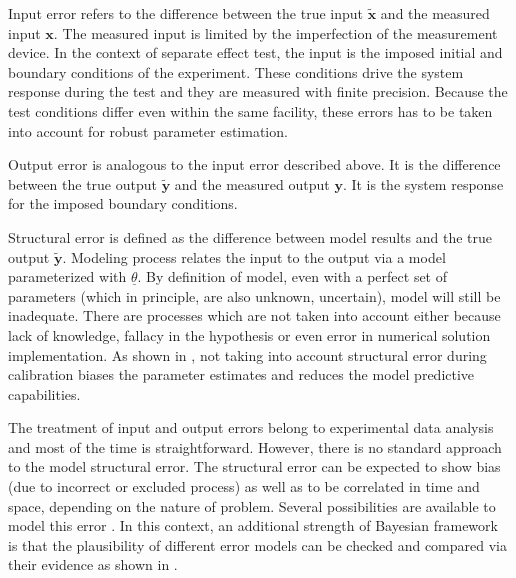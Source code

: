 \documentclass[11pt,titlepage]{article}
\begin{document}
Input error refers to the difference between the true input $\mathbf{\tilde{x}}$ and the measured input $\mathbf{x}$. The measured input is limited by the imperfection of the measurement device. In the context of separate effect test, the input is the imposed initial and boundary conditions of the experiment. These conditions drive the system response during the test and they are measured with finite precision. Because the test conditions differ even within the same facility, these errors has to be taken into account for robust parameter estimation.

Output error is analogous to the input error described above. It is the difference between the true output $\mathbf{\tilde{y}}$ and the measured output $\mathbf{y}$. It is the system response for the imposed boundary conditions. 

Structural error is defined as the difference between model results and the true output $\mathbf{\tilde{y}}$. Modeling process relates the input to the output via a model parameterized with $\underline{\theta}$. By definition of model, even with a perfect set of parameters (which in principle, are also unknown, uncertain), model will still be inadequate. There are processes which are not taken into account either because lack of knowledge, fallacy in the hypothesis or even error in numerical solution implementation. As shown in \cite{KennedyOHagan2001}, not taking into account structural error during calibration biases the parameter estimates and reduces the model predictive capabilities.

The treatment of input and output errors belong to experimental data analysis and most of the time is straightforward. However, there is no standard approach to the model structural error. The structural error can be expected to show bias (due to incorrect or excluded process) as well as to be correlated in time and space, depending on the nature of problem. Several possibilities are available to model this error \cite{Simoen2013, Schoups2010}. In this context, an additional strength of Bayesian framework is that the plausibility of different error models can be checked and compared via their evidence as shown in \cite{Beck2010}.
\end{document}
